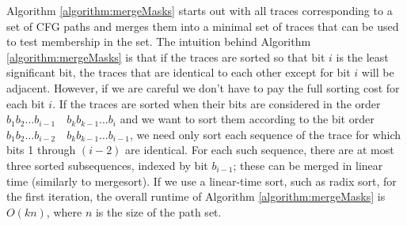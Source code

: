 Algorithm \ref{algorithm:mergeMasks} starts out with all traces corresponding to a set of CFG paths and merges them into a minimal set of traces that can be used to test membership in the set. 
The intuition behind Algorithm \ref{algorithm:mergeMasks} is that if the traces are sorted so that bit $i$ is the least significant bit, the traces that are identical to each other except for bit $i$ will be adjacent. 
However, if we are careful we don't have to pay the full sorting cost for each bit $i$. 
If the traces are sorted when their bits are considered in the order $b_{1} b_{2} \dots b_{i - 1} \quad b_{k} b_{k - 1} \dots b_{i} $ and we want to sort them according to the bit order $b_{1} b_{2} \dots b_{i - 2} \quad b_{k} b_{k - 1} \dots b_{i - 1} $, we need only sort each sequence of the trace for which bits 1 through $(i-2)$ are identical. 
For each such sequence, there are at most three sorted subsequences, indexed by bit $b_{i-1}$; these can be merged in linear time (similarly to mergesort).
If we use a linear-time sort, such as radix sort, for the first iteration, the overall runtime of Algorithm \ref{algorithm:mergeMasks} is $O(k n)$, where $n$ is the size of the path set.


